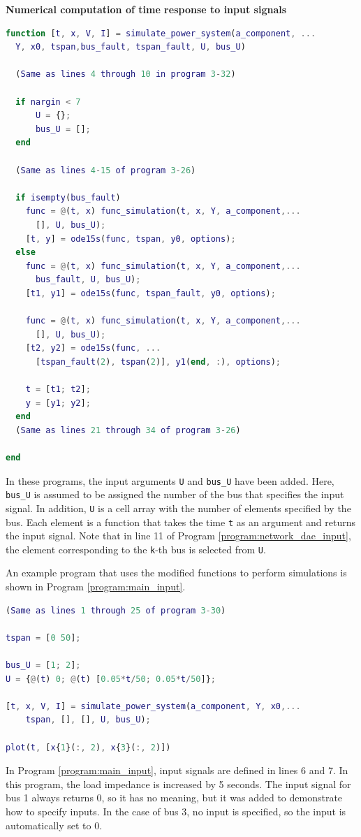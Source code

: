 \documentclass[graybox, envcountchap]{svmult}
\begin{document}
\begin{example}{\textbf{Numerical computation of time response to input signals}}
\begin{lstlisting}[language=Matlab, caption=simulate\_power\_system.m, label={program:simulate_network3}]
function [t, x, V, I] = simulate_power_system(a_component, ...
  Y, x0, tspan,bus_fault, tspan_fault, U, bus_U)

  (Same as lines 4 through 10 in program 3-32)

  if nargin < 7
      U = {};
      bus_U = [];
  end

  (Same as lines 4-15 of program 3-26)

  if isempty(bus_fault)
    func = @(t, x) func_simulation(t, x, Y, a_component,...
      [], U, bus_U);
    [t, y] = ode15s(func, tspan, y0, options);
  else
    func = @(t, x) func_simulation(t, x, Y, a_component,...
      bus_fault, U, bus_U);
    [t1, y1] = ode15s(func, tspan_fault, y0, options);
    
    func = @(t, x) func_simulation(t, x, Y, a_component,...
      [], U, bus_U);
    [t2, y2] = ode15s(func, ...
      [tspan_fault(2), tspan(2)], y1(end, :), options);
    
    t = [t1; t2];
    y = [y1; y2];
  end
  (Same as lines 21 through 34 of program 3-26)

end
\end{lstlisting}

In these programs, the input arguments \verb|U| and \verb|bus_U| have been
added. Here, \verb|bus_U| is assumed to be assigned the number of the bus that
specifies the input signal. In addition, \verb|U| is a cell array with the
number of elements specified by the bus. Each element is a function that takes
the time \verb|t| as an argument and returns the input signal. Note that in line
11 of Program \ref{program:network_dae_input}, the element corresponding to the
\verb|k|-th bus is selected from \verb|U|.

An example program that uses the modified functions to perform simulations is
shown in Program \ref{program:main_input}.

\begin{lstlisting}[language=Matlab, caption=main\_simulation\_3bus\_input.m, label={program:main_input}]
  (Same as lines 1 through 25 of program 3-30)

tspan = [0 50];

bus_U = [1; 2];
U = {@(t) 0; @(t) [0.05*t/50; 0.05*t/50]};

[t, x, V, I] = simulate_power_system(a_component, Y, x0,...
    tspan, [], [], U, bus_U);

plot(t, [x{1}(:, 2), x{3}(:, 2)])
\end{lstlisting}

In Program \ref{program:main_input}, input signals are defined in lines 6 and 7.
In this program, the load impedance is increased by 5%
seconds. The input signal for bus 1 always returns 0, so it has no meaning, but
it was added to demonstrate how to specify inputs. In the case of bus 3, no
input is specified, so the input is automatically set to 0.


\end{example}
\end{document}
